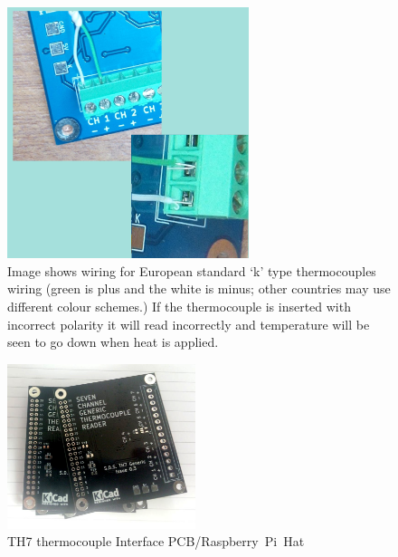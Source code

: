 \documentclass[10pt,foldmark]{leaflet}
\begin{document}
\begin{figure}[h]
 \centering
 \includegraphics[width=200pt]{./wiring.jpg}
 \caption{Image shows wiring for European standard `k' type thermocouples wiring (green is plus and the white is minus; other countries may use different colour schemes.)
%
 If the thermocouple is inserted with incorrect polarity it will read incorrectly and temperature will be seen to go down when heat is applied.}
 \label{fig:con}
\end{figure}

\begin{figure}[h]
 \centering
 \includegraphics[width=156pt]{./TH7_0p3.jpg}
 \caption{TH7 thermocouple Interface PCB/Raspberry~Pi~Hat}
 \label{fig:th7_2}
\end{figure}
\end{document}

